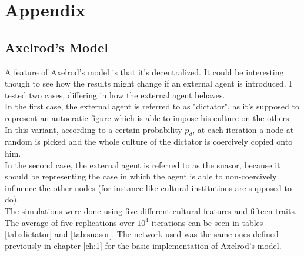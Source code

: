 \chapter{Appendix}


\section{Axelrod's Model}\label{ch:app1}

A feature of Axelrod's model is that it's decentralized. It could be interesting though to see how the results might change if an external agent is introduced. I tested two cases, differing in how the external agent behaves. \\
In the first case, the external agent is referred to as "dictator", as it's supposed to represent an autocratic figure which is able to impose his culture on the others. In this variant, according to a certain probability $p_d$, at each iteration a node at random is picked and the whole culture of the dictator is coercively copied onto him. \\
In the second case, the external agent is referred to as the suasor, because it should be representing the case in which the agent is able to non-coercively influence the other nodes (for instance like cultural institutions are supposed to do). \\
The simulations were done using five different cultural features and fifteen traits. The average of five replications over $10^4$ iterations can be seen in tables \ref{tab:dictator} and \ref{tab:suasor}. The network used was the same ones defined previously in chapter \ref{ch:1} for the basic implementation of Axelrod's model.



